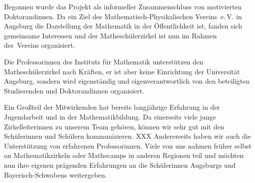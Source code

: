\documentclass[12pt]{zettel}
\begin{document}
Begonnen wurde das Projekt als informeller Zusammenschluss von motivierten Doktorandinnen. Da ein Ziel des Mathematisch-Physikalischen Vereins~e.\,V. in Augsburg die Darstellung
der Mathematik in der Öffentlichkeit ist, fanden sich gemeinsame Interessen und der Matheschülerzirkel ist nun im Rahmen des~Vereins organisiert.

Die Professorinnen des Instituts für Mathematik unterstützen den Matheschülerzirkel nach Kräften, er ist aber keine Einrichtung der Universität
Augsburg, sondern wird eigenständig und eigenverantwortlich von den beteiligten Studierenden und Doktorandinnen organisiert.

Ein Großteil der Mitwirkenden hat bereits langjährige Erfahrung in
der Jugendarbeit und in der Mathematikbildung. Da einerseits viele junge Zirkelleiterinnen zu unserem Team gehören, können wir
sehr gut mit den Schülerinnen und Schülern kommunizieren. XXX
Andererseits haben wir auch die Unterstützung von erfahrenen Professorinnen.
Viele von uns nahmen früher selbst an Mathematikzirkeln oder
Mathecamps in anderen Regionen teil und möchten nun ihre eigenen prägenden Erfahrungen an die Schülerinnen Augsburgs und Bayerisch-Schwabens weitergeben.
\end{document}
